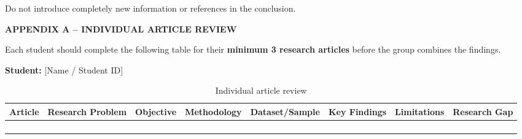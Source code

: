 \documentclass[12pt,a4paper]{article}
\begin{document}
Do not introduce completely new information or references in the conclusion.







\newpage

{}

\printbibliography[
    title={References}
]






\newpage

{}

\begin{flushleft}
    {\fontsize{14pt}{17pt}\selectfont
    \textbf{APPENDIX A -- INDIVIDUAL ARTICLE REVIEW}}
\end{flushleft}

\vspace{0.5cm}

Each student should complete the following table for their
\textbf{minimum 3 research articles} before the group combines the findings.

\vspace{0.5cm}

\textbf{Student:} [Name / Student ID]


\begin{table}[H]

\caption{Individual article review}
\label{tab:individual-article-review}

\fontsize{10pt}{12pt}\selectfont

\begin{tabular}{|p{1.5cm}|p{2.1cm}|p{1.8cm}|p{2.2cm}|p{2.1cm}|p{2.2cm}|p{2.0cm}|p{2.0cm}|}
\hline

\centering\textbf{Article} &
\centering\textbf{Research Problem} &
\centering\textbf{Objective} &
\centering\textbf{Methodology} &
\centering\textbf{Dataset/Sample} &
\centering\textbf{Key Findings} &
\centering\textbf{Limitations} &
\centering\textbf{Research Gap}
\tabularnewline
\hline

&  &  &  &  &  &  & 
\tabularnewline
\hline

&  &  &  &  &  &  & 
\tabularnewline
\hline

&  &  &  &  &  &  & 
\tabularnewline
\hline

&  &  &  &  &  &  & 
\tabularnewline
\hline

\end{tabular}

\end{table}
\end{document}

